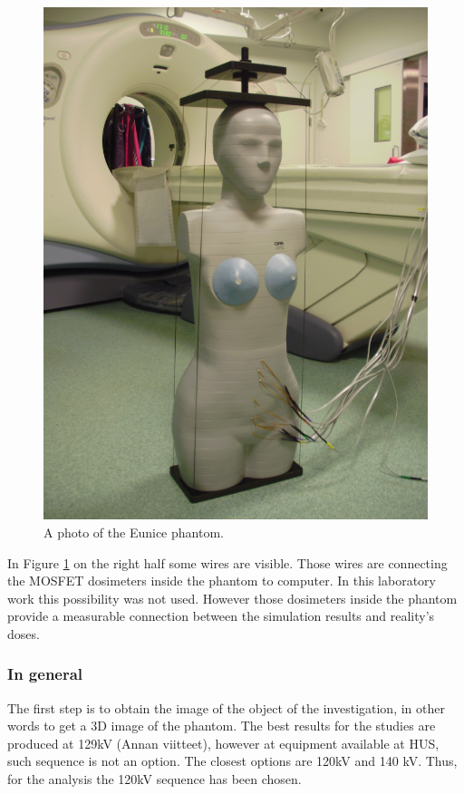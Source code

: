 \documentclass[fleqn,10pt]{SelfArx} %
\begin{document}
\begin{figure}[ht]\centering
\includegraphics[width=0.9\linewidth]{EuniceReal}
\caption{A photo of the Eunice phantom.} 

\label{fig:EuniceReal}
\end{figure}

In Figure \ref{fig:EuniceReal} on the right half some wires are visible. Those wires are connecting the MOSFET dosimeters inside the phantom to computer. In this laboratory work this possibility was not used. However those dosimeters inside the phantom provide a measurable connection between the simulation results and reality's doses.


\subsubsection{In general}
The first step is to obtain the image of the object of the investigation, in other words to get a 3D image of the phantom. The best results for the studies are produced at 129kV (Annan viitteet), however at equipment available at HUS, such sequence is not an option. The closest options are 120kV and 140 kV. Thus, for the analysis the 120kV sequence has been chosen.
\end{document}
